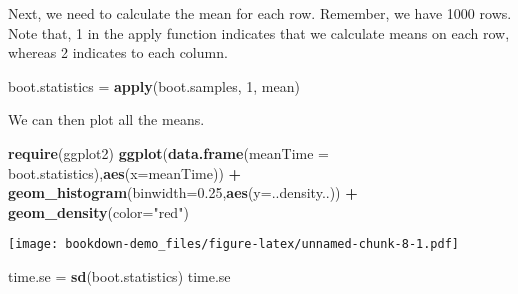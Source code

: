 \documentclass[]{book}
\newenvironment{Shaded}{\begin{snugshade}}{\end{snugshade}}
\newcommand{\DataTypeTok}[1]{\textcolor[rgb]{0.13,0.29,0.53}{#1}}
\newcommand{\DecValTok}[1]{\textcolor[rgb]{0.00,0.00,0.81}{#1}}
\newcommand{\FloatTok}[1]{\textcolor[rgb]{0.00,0.00,0.81}{#1}}
\newcommand{\KeywordTok}[1]{\textcolor[rgb]{0.13,0.29,0.53}{\textbf{#1}}}
\newcommand{\NormalTok}[1]{#1}
\newcommand{\OperatorTok}[1]{\textcolor[rgb]{0.81,0.36,0.00}{\textbf{#1}}}
\newcommand{\OtherTok}[1]{\textcolor[rgb]{0.56,0.35,0.01}{#1}}
\newcommand{\StringTok}[1]{\textcolor[rgb]{0.31,0.60,0.02}{#1}}
\begin{document}
\begin{Shaded}
\end{Shaded}

Next, we need to calculate the mean for each row. Remember, we have 1000 rows. Note that, 1 in the apply function indicates that we calculate means on each row, whereas 2 indicates to each column.

\begin{Shaded}
\begin{Highlighting}[]
\NormalTok{boot.statistics =}\StringTok{ }\KeywordTok{apply}\NormalTok{(boot.samples, }\DecValTok{1}\NormalTok{, mean)}
\end{Highlighting}
\end{Shaded}

We can then plot all the means.

\begin{Shaded}
\begin{Highlighting}[]
\KeywordTok{require}\NormalTok{(ggplot2)}
\KeywordTok{ggplot}\NormalTok{(}\KeywordTok{data.frame}\NormalTok{(}\DataTypeTok{meanTime =}\NormalTok{ boot.statistics),}\KeywordTok{aes}\NormalTok{(}\DataTypeTok{x=}\NormalTok{meanTime)) }\OperatorTok{+}
\KeywordTok{geom_histogram}\NormalTok{(}\DataTypeTok{binwidth=}\FloatTok{0.25}\NormalTok{,}\KeywordTok{aes}\NormalTok{(}\DataTypeTok{y=}\NormalTok{..density..)) }\OperatorTok{+}
\KeywordTok{geom_density}\NormalTok{(}\DataTypeTok{color=}\StringTok{"red"}\NormalTok{)}
\end{Highlighting}
\end{Shaded}

\texttt{[image: bookdown-demo\_files/figure-latex/unnamed-chunk-8-1.pdf]}

\begin{Shaded}
\begin{Highlighting}[]
\NormalTok{time.se =}\StringTok{ }\KeywordTok{sd}\NormalTok{(boot.statistics)}
\NormalTok{time.se}
\end{Highlighting}
\end{Shaded}
\end{document}
